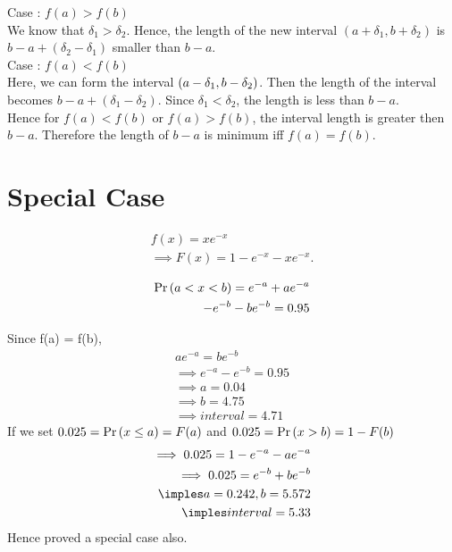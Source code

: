 \documentclass[journal,12pt,twocolumn]{IEEEtran}
\begin{document}
 \pagebreak
 
Case : $f(a) > f(b)$\\
    We know that $\delta_1 > \delta_2$. Hence, the length of the new interval $(a+\delta_1, b+\delta_2)$ is $b-a + (\delta_2-\delta_1)$ smaller than $b-a$.\\
 

 
Case : $f(a) < f(b)$\\
Here, we can form the interval $\left(a-\delta_1, b-\delta_2\right)$. Then the length of the interval becomes $b-a+ (\delta_1 - \delta_2)$. Since $\delta_1 < \delta_2$, the length is less than $b-a$. \\
    Hence for $f(a) < f(b)$ or $f(a) > f(b)$, the interval length is greater then $b-a$. Therefore the length of $b-a$ is minimum iff $f(a) = f(b)$.
    
\section{Special Case}    
\begin{align}
            f(x) = xe^{-x}\\
            \implies F(x) = 1-e^{-x}-xe^{-x}.
            \end{align}
            
\begin{align}
        \begin{split}
            \Pr\left(a < x < b\right) = e^{-a} + ae^{-a}
            \\    
                - e^{-b} - be^{-b} = 0.95
        \end{split}
\end{align}

Since f(a) = f(b), 
    \begin{align}
        ae^{-a} = be^{-b}\\
        \implies e^{-a} - e^{-b} = 0.95\\
        \implies a = 0.04\\
        \implies b = 4.75\\
        \implies interval = 4.71
    \end{align}
    If we set  $0.025 = \Pr\left(x \le a\right) = F(a)$ and $0.025 = \Pr\left(x > b\right) = 1 - F(b)$\\
    \begin{align}
        \implies 0.025 = 1 - e^{-a}-ae^{-a}\\
        \implies 0.025 = e^{-b} + be^{-b}\\
        \imples a = 0.242, b = 5.572\\
        \imples interval = 5.33
    \end{align}
    Hence proved a special case also.
\end{document}

